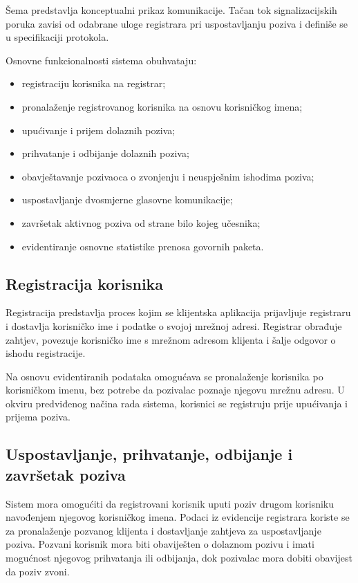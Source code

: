 Šema predstavlja konceptualni prikaz komunikacije. Tačan tok signalizacijskih poruka zavisi od odabrane uloge registrara pri uspostavljanju poziva i definiše se u specifikaciji protokola.

Osnovne funkcionalnosti sistema obuhvataju:
\begin{itemize}
    \item registraciju korisnika na registrar;
    \item pronalaženje registrovanog korisnika na osnovu korisničkog imena;
    \item upućivanje i prijem dolaznih poziva;
    \item prihvatanje i odbijanje dolaznih poziva;
    \item obavještavanje pozivaoca o zvonjenju i neuspješnim ishodima poziva;
    \item uspostavljanje dvosmjerne glasovne komunikacije;
    \item završetak aktivnog poziva od strane bilo kojeg učesnika;
    \item evidentiranje osnovne statistike prenosa govornih paketa.
\end{itemize}

\subsection{Registracija korisnika}

Registracija predstavlja proces kojim se klijentska aplikacija prijavljuje registraru i dostavlja korisničko ime i podatke o svojoj mrežnoj adresi. Registrar obrađuje zahtjev, povezuje korisničko ime s mrežnom adresom klijenta i šalje odgovor o ishodu registracije.

Na osnovu evidentiranih podataka omogućava se pronalaženje korisnika po korisničkom imenu, bez potrebe da pozivalac poznaje njegovu mrežnu adresu. U okviru predviđenog načina rada sistema, korisnici se registruju prije upućivanja i prijema poziva.

\subsection{Uspostavljanje, prihvatanje, odbijanje i završetak poziva}

Sistem mora omogućiti da registrovani korisnik uputi poziv drugom korisniku navođenjem njegovog korisničkog imena. Podaci iz evidencije registrara koriste se za pronalaženje pozvanog klijenta i dostavljanje zahtjeva za uspostavljanje poziva. Pozvani korisnik mora biti obaviješten o dolaznom pozivu i imati mogućnost njegovog prihvatanja ili odbijanja, dok pozivalac mora dobiti obavijest da poziv zvoni.

